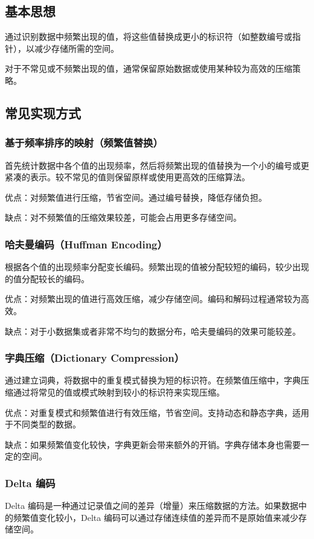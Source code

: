 \documentclass[12pt]{article}
\begin{document}
\subsection{基本思想}
通过识别数据中频繁出现的值，将这些值替换成更小的标识符（如整数编号或指针），以减少存储所需的空间。

对于不常见或不频繁出现的值，通常保留原始数据或使用某种较为高效的压缩策略。

\subsection{常见实现方式}

\subsubsection{基于频率排序的映射（频繁值替换）}
首先统计数据中各个值的出现频率，然后将频繁出现的值替换为一个小的编号或更紧凑的表示。较不常见的值则保留原样或使用更高效的压缩算法。

优点：对频繁值进行压缩，节省空间。通过编号替换，降低存储负担。

缺点：对不频繁值的压缩效果较差，可能会占用更多存储空间。

\subsubsection{哈夫曼编码（Huffman Encoding）}
根据各个值的出现频率分配变长编码。频繁出现的值被分配较短的编码，较少出现的值分配较长的编码。

优点：对频繁出现的值进行高效压缩，减少存储空间。编码和解码过程通常较为高效。

缺点：对于小数据集或者非常不均匀的数据分布，哈夫曼编码的效果可能较差。

\subsubsection{字典压缩（Dictionary Compression）}
通过建立词典，将数据中的重复模式替换为短的标识符。在频繁值压缩中，字典压缩通过将常见的值或模式映射到较小的标识符来实现压缩。

优点：对重复模式和频繁值进行有效压缩，节省空间。支持动态和静态字典，适用于不同类型的数据。

缺点：如果频繁值变化较快，字典更新会带来额外的开销。字典存储本身也需要一定的空间。

\subsubsection{Delta 编码}
Delta 编码是一种通过记录值之间的差异（增量）来压缩数据的方法。如果数据中的频繁值变化较小，Delta 编码可以通过存储连续值的差异而不是原始值来减少存储空间。
\end{document}
